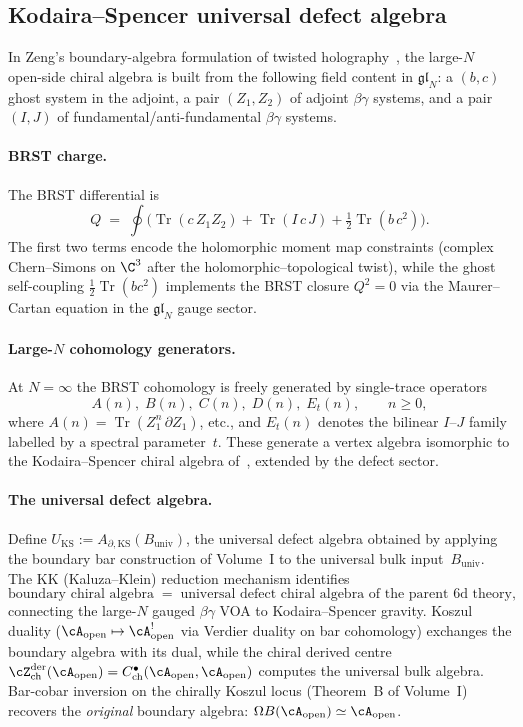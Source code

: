 \subsection{Kodaira--Spencer universal defect algebra}
\label{subsec:KS-defect}

In Zeng's boundary-algebra formulation of twisted holography~\cite{Zeng2024,CDG2023},
the large-$N$ open-side chiral algebra is built from the following field content
in $\mathfrak{gl}_N$: a $(b,c)$ ghost system in the adjoint,
a pair $(Z_1,Z_2)$ of adjoint $\beta\gamma$ systems, and
a pair $(I,J)$ of fundamental/anti-fundamental $\beta\gamma$ systems.

\paragraph{BRST charge.}
The BRST differential is
\[
 Q \;=\; \oint\!\bigl(\operatorname{Tr}(c\,Z_1 Z_2)
 + \operatorname{Tr}(I\,c\,J)
 + \tfrac{1}{2}\operatorname{Tr}(b\,c^2)\bigr).
\]
The first two terms encode the holomorphic moment map constraints
(complex Chern--Simons on $\C^3$ after the holomorphic--topological twist),
while the ghost self-coupling $\frac{1}{2}\operatorname{Tr}(bc^2)$
implements the BRST closure $Q^2=0$ via the Maurer--Cartan equation
in the $\mathfrak{gl}_N$ gauge sector.

\paragraph{Large-$N$ cohomology generators.}
At $N=\infty$ the BRST cohomology is freely generated by
single-trace operators
\[
 A(n),\; B(n),\; C(n),\; D(n),\; E_t(n),
 \qquad n \ge 0,
\]
where $A(n)=\operatorname{Tr}(Z_1^n\,\partial Z_1)$, etc., and $E_t(n)$
denotes the bilinear $I$--$J$ family labelled by a spectral parameter~$t$.
These generate a vertex algebra isomorphic to the Kodaira--Spencer
chiral algebra of~\cite{BCOV93}, extended by the defect sector.

\paragraph{The universal defect algebra.}
Define $U_{\mathrm{KS}} := A_{\partial,\mathrm{KS}}(B_{\mathrm{univ}})$, the
universal defect algebra obtained by applying the boundary
bar construction of Volume~I to the universal bulk input~$B_{\mathrm{univ}}$.
The KK (Kaluza--Klein) reduction mechanism identifies
\[
 \text{boundary chiral algebra}
 \;=\;
 \text{universal defect chiral algebra of the parent 6d theory},
\]
connecting the large-$N$ gauged $\beta\gamma$ VOA
to Kodaira--Spencer gravity. Koszul duality
($\cA_{\mathrm{open}} \mapsto \cA^!_{\mathrm{open}}$
via Verdier duality on bar cohomology) exchanges the
boundary algebra with its dual, while the chiral derived
centre $\cZ^{\mathrm{der}}_{\mathrm{ch}}(\cA_{\mathrm{open}})
= C^\bullet_{\mathrm{ch}}(\cA_{\mathrm{open}},
\cA_{\mathrm{open}})$ computes the universal bulk algebra.
Bar-cobar inversion on the chirally Koszul locus
\textup{(}Theorem~B of Volume~I\textup{)} recovers the
\emph{original} boundary algebra:
$\Omega B(\cA_{\mathrm{open}}) \simeq \cA_{\mathrm{open}}$.

